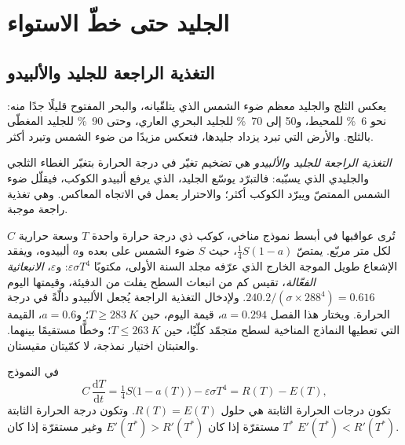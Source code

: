 \section{الجليد حتى خطّ الاستواء}\label{sec:b2:precambrian-earth:snowball}

\subsection*{التغذية الراجعة للجليد والألبيدو}

يعكس الثلج والجليد معظم ضوء الشمس الذي يتلقّيانه، والبحر المفتوح قليلًا جدًا منه: نحو
\qty{6}{\percent} للمحيط، و50 إلى \qty{70}{\percent} للجليد البحري العاري، وحتى
\qty{90}{\percent} للجليد المغطّى بالثلج. والأرض التي تبرد يزداد جليدها، فتعكس مزيدًا من
ضوء الشمس وتبرد أكثر.

\begin{definition}\label{def:b2:precambrian-earth:ice-albedo}
\emph{التغذية الراجعة للجليد والألبيدو} هي تضخيم تغيّر
في درجة الحرارة بتغيّر الغطاء الثلجي والجليدي الذي يسبّبه: فالتبرّد يوسّع الجليد، الذي
يرفع ألبيدو الكوكب، فيقلّل ضوء الشمس الممتصّ ويبرّد الكوكب أكثر؛ والاحترار
يعمل في الاتجاه المعاكس. وهي تغذية راجعة موجبة.
\end{definition}

تُرى عواقبها في أبسط نموذج مناخي، كوكب ذي درجة حرارة واحدة $T$
وسعة حرارية $C$ لكل متر مربّع. يمتصّ $\tfrac14 S(1 - a)$، حيث $S$ ضوء الشمس
على بعده و$a$ ألبيدوه، ويفقد الإشعاع طويل الموجة الخارج الذي عرّفه مجلد السنة
الأولى، مكتوبًا $\varepsilon\sigma T^4$: و$\varepsilon$، \emph{الانبعاثية الفعّالة}،
تقيس كم من انبعاث السطح يفلت من الدفيئة، وقيمتها اليوم
$240.2/(\sigma\times288^4) = 0.616$. ولإدخال التغذية الراجعة يُجعل الألبيدو دالّةً في
درجة الحرارة. ويختار هذا الفصل $a = 0.294$، قيمة اليوم، حين $T \ge \qty{283}{K}$؛ و$a
= 0.6$، القيمة التي تعطيها النماذج المناخية لسطح متجمّد كلّيًا، حين $T \le \qty{263}{K}$؛
وخطًّا مستقيمًا بينهما. والعتبتان اختيار نمذجة، لا كمّيتان
مقيستان.

\begin{proposition}\label{prop:b2:precambrian-earth:ebm}
في النموذج
\[
  C\,\frac{\mathrm dT}{\mathrm dt} = \tfrac14 S\bigl(1 - a(T)\bigr) - \varepsilon\sigma T^4
  = R(T) - E(T),
\]
تكون درجات الحرارة الثابتة هي حلول $R(T) = E(T)$. وتكون درجة الحرارة الثابتة $T^*$
مستقرّة إذا كان $E'(T^*) > R'(T^*)$ وغير مستقرّة إذا كان $E'(T^*) < R'(T^*)$.
\end{proposition}

